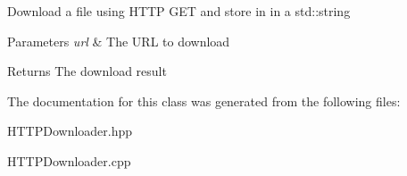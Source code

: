 Download a file using H\+T\+TP G\+ET and store in in a std\+::string 
\begin{DoxyParams}{Parameters}
{\em url} & The U\+RL to download \\
\hline
\end{DoxyParams}
\begin{DoxyReturn}{Returns}
The download result 
\end{DoxyReturn}


The documentation for this class was generated from the following files\+:\begin{DoxyCompactItemize}
\item 
H\+T\+T\+P\+Downloader.\+hpp\item 
H\+T\+T\+P\+Downloader.\+cpp\end{DoxyCompactItemize}
